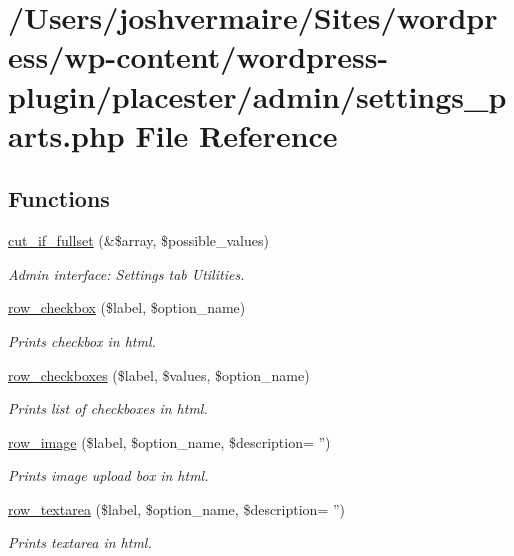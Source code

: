 \hypertarget{settings__parts_8php}{
\section{/Users/joshvermaire/Sites/wordpress/wp-\/content/wordpress-\/plugin/placester/admin/settings\_\-parts.php File Reference}
\label{d5/d18/settings__parts_8php}
}
\subsection*{Functions}
\begin{DoxyCompactItemize}
\item 
\hyperlink{settings__parts_8php_ac8c5bb039ec65478ba227e5cbb9c7a9b}{cut\_\-if\_\-fullset} (\&\$array, \$possible\_\-values)
\begin{DoxyCompactList}\small\item\em Admin interface: Settings tab Utilities. \end{DoxyCompactList}\item 
\hyperlink{settings__parts_8php_ae6ebb7521b96db18d92128275dd57e86}{row\_\-checkbox} (\$label, \$option\_\-name)
\begin{DoxyCompactList}\small\item\em Prints checkbox in html. \end{DoxyCompactList}\item 
\hyperlink{settings__parts_8php_aa5bc0c1ff95298729f9a56dd4be9e553}{row\_\-checkboxes} (\$label, \$values, \$option\_\-name)
\begin{DoxyCompactList}\small\item\em Prints list of checkboxes in html. \end{DoxyCompactList}\item 
\hyperlink{settings__parts_8php_a4cf4e6f0bd38422d5bb6653d91c78ceb}{row\_\-image} (\$label, \$option\_\-name, \$description= '')
\begin{DoxyCompactList}\small\item\em Prints image upload box in html. \end{DoxyCompactList}\item 
\hyperlink{settings__parts_8php_a52cab0df43d23b6a188752f64e583290}{row\_\-textarea} (\$label, \$option\_\-name, \$description= '')
\begin{DoxyCompactList}\small\item\em Prints textarea in html. \end{DoxyCompactList}\item 

\end{DoxyCompactItemize}
